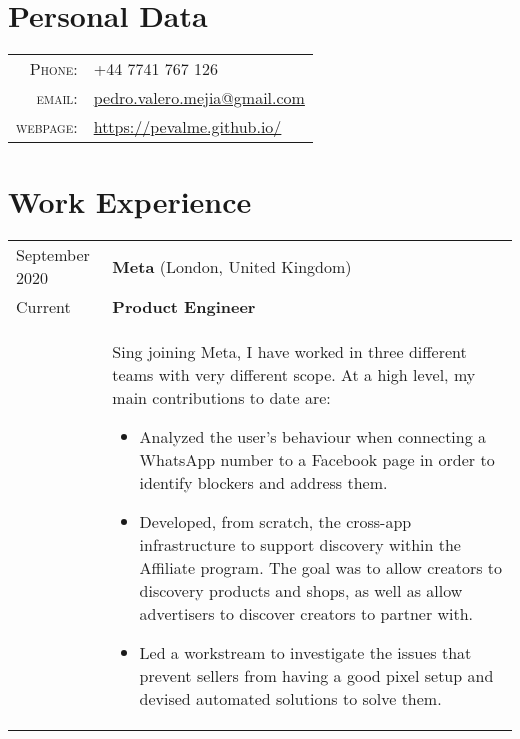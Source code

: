 \documentclass[a4paper,10pt]{article} %
\begin{document}
\pagestyle{empty} %




\par{\bigskip\par} %

\section{Personal Data}

\begin{tabular}{rl}
\textsc{Phone:} & +44 7741 767 126\\
\textsc{email:} & \href{mailto:pedro.valero.mejia@gmail.com}{pedro.valero.mejia@gmail.com} \\
\textsc{webpage:} & \href{https://pevalme.github.io/}{https://pevalme.github.io/}\\
\end{tabular}

\section{Work Experience}

\begin{tabular}{p{2.5cm}p{13.2cm}}
{\small September 2020} & \textbf{Meta} (London, United Kingdom) \\
{\small Current} & \textcolor{azureblue}{\textbf{Product Engineer}} \hfill  \\
& Sing joining Meta, I have worked in three different teams with very different scope. At a high level, my main contributions to date are:
\begin{itemize}
\item Analyzed the user's behaviour when connecting a WhatsApp number to a Facebook page in order to identify blockers and address them.
\item Developed, from scratch, the cross-app infrastructure to support discovery within the Affiliate program. The goal was to allow creators to
discovery products and shops, as well as allow advertisers to discover creators to partner with.
\item Led a workstream to investigate the issues that prevent sellers from having a good pixel setup and devised automated solutions to solve them.\vspace*{-\baselineskip}
\end{itemize}
\end{tabular}
\end{document}
